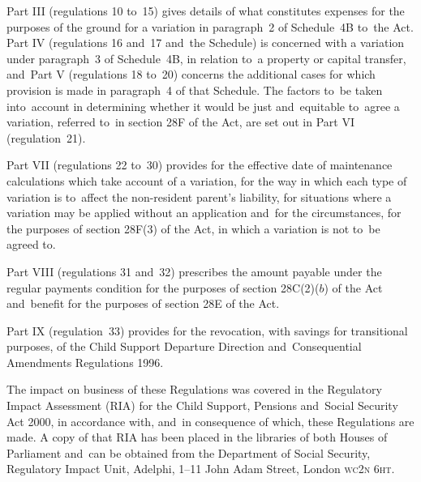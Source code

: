 \documentclass[12pt,a4paper]{article}
\begin{document}
Part III (regulations 10 to~15) gives details of what constitutes expenses for the purposes of the ground for a variation in paragraph~2 of Schedule~4B to~the Act. Part IV (regulations 16 and~17 and~the Schedule) is concerned with a variation under paragraph~3 of Schedule~4B, in relation to~a property or capital transfer, and~Part V (regulations 18 to~20) concerns the additional cases for which provision is made in paragraph~4 of that Schedule. The factors to~be taken into~account in determining whether it would be just and~equitable to~agree a variation, referred to~in section 28F of the Act, are set out in Part VI (regulation~21).

Part VII (regulations 22 to~30) provides for the effective date of maintenance calculations which take account of a variation, for the way in which each type of variation is to~affect the non-resident parent’s liability, for situations where a variation may be applied without an application and~for the circumstances, for the purposes of section 28F(3) of the Act, in which a variation is not to~be agreed to.

Part VIII (regulations 31 and~32) prescribes the amount payable under the regular payments condition for the purposes of section 28C(2)($b$)  of the Act and~benefit for the purposes of section 28E of the Act.

Part IX (regulation~33) provides for the revocation, with savings for transitional purposes, of the Child Support Departure Direction and~Consequential Amendments Regulations 1996.

The impact on business of these Regulations was covered in the Regulatory Impact Assessment (RIA) for the Child Support, Pensions and~Social Security Act 2000, in accordance with, and~in consequence of which, these Regulations are made. A copy of that RIA has been placed in the libraries of both Houses of Parliament and~can be obtained from the Department of Social Security, Regulatory Impact Unit, Adelphi, 1--11 John Adam Street, London \textsc{\lowercase{WC2N 6HT}}. 
\end{document}
